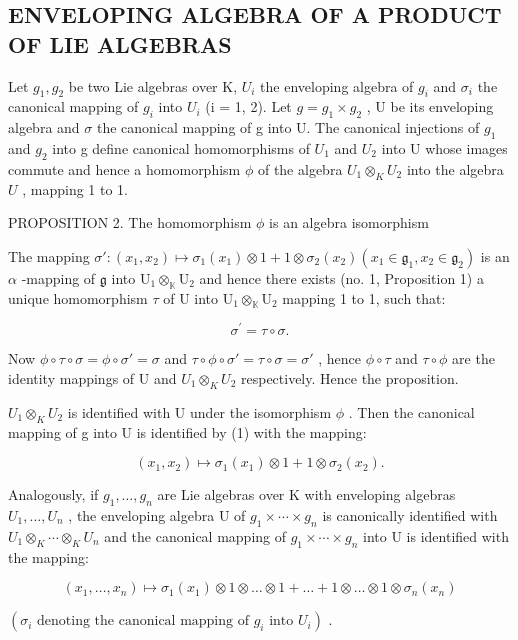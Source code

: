\subsection{ENVELOPING ALGEBRA OF A PRODUCT OF LIE ALGEBRAS}

Let \(g_{1}, g_{2}\) be two Lie algebras over K, \(U_{i}\) the enveloping algebra of \(g_{i}\) and \(\sigma_{i}\) the canonical mapping of \(g_{i}\) into \(U_{i}\) (i = 1, 2). Let \(g = g_{1} \times g_{2}\) , U be its enveloping algebra and \(\sigma\) the canonical mapping of g into U. The canonical injections of \(g_{1}\) and \(g_{2}\) into g define canonical homomorphisms of \(U_{1}\) and \(U_{2}\) into U whose images commute and hence a homomorphism \(\phi\) of the algebra \(U_1 \otimes_K U_2\) into the algebra \(U\) , mapping 1 to 1.

PROPOSITION 2. The homomorphism \(\phi\) is an algebra isomorphism

The mapping \(\sigma': (x_1, x_2) \mapsto \sigma_1(x_1) \otimes 1 + 1 \otimes \sigma_2(x_2) (x_1 \in \mathfrak{g}_1, x_2 \in \mathfrak{g}_2)\) is an \(\alpha\) -mapping of \(\mathfrak{g}\) into \(\mathrm{U}_1 \otimes_{\mathbb{K}} \mathrm{U}_2\) and hence there exists (no. 1, Proposition 1) a unique homomorphism \(\tau\) of \(\mathrm{U}\) into \(\mathrm{U}_1 \otimes_{\mathbb{K}} \mathrm{U}_2\) mapping 1 to 1, such that:

\[
\sigma^ {\prime} = \tau \circ \sigma .\tag{1}
\]

Now \(\phi \circ \tau \circ \sigma = \phi \circ \sigma' = \sigma\) and \(\tau \circ \phi \circ \sigma' = \tau \circ \sigma = \sigma'\) , hence \(\phi \circ \tau\) and \(\tau \circ \phi\) are the identity mappings of U and \(U_1 \otimes_K U_2\) respectively. Hence the proposition.

\(U_{1} \otimes_{K} U_{2}\) is identified with U under the isomorphism \(\phi\) . Then the canonical mapping of g into U is identified by (1) with the mapping:

\[
(x _ {1}, x _ {2}) \mapsto \sigma_ {1} (x _ {1}) \otimes 1 + 1 \otimes \sigma_ {2} (x _ {2}).
\]

Analogously, if \(g_{1},\ldots,g_{n}\) are Lie algebras over K with enveloping algebras \(U_{1},\ldots,U_{n}\) , the enveloping algebra U of \(g_{1}\times\cdots\times g_{n}\) is canonically identified with \(U_{1}\otimes_{K}\cdots\otimes_{K}U_{n}\) and the canonical mapping of \(g_{1}\times\cdots\times g_{n}\) into U is identified with the mapping:

\[
(x _ {1}, \dots , x _ {n}) \mapsto \sigma_ {1} (x _ {1}) \otimes 1 \otimes \dots \otimes 1 + \dots + 1 \otimes \dots \otimes 1 \otimes \sigma_ {n} (x _ {n})
\]

\((\sigma_{i} \text{ denoting the canonical mapping of } g_{i} \text{ into } U_{i})\) .

